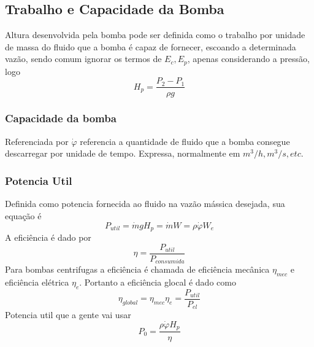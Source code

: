 \subsection{Trabalho e Capacidade da Bomba}
Altura desenvolvida pela bomba pode ser definida como o trabalho por unidade de massa do fluido que
a bomba é capaz de fornecer, escoando a determinada vazão, sendo comum ignorar os termos de
\(E_c,E_p\), apenas considerando a pressão, logo
\begin{equation}
    H_p = \frac{P_2 - P_1}{\rho g}
\end{equation}
 \subsubsection{Capacidade da bomba}
 Referenciada por \(\dot{\varphi }\) referencia a quantidade de fluido que a bomba consegue
 descarregar por unidade de tempo. Expressa, normalmente em \(m^3/h, m^3/s, etc\). 
 \subsubsection{Potencia Util}
 Definida como potencia fornecida ao fluido na vazão mássica desejada, sua equação é
 \begin{equation}
     P_{util} = \dot{m}gH_p = \dot{m}W = \rho \dot{\varphi} W_e
 \end{equation}
 A eficiência é dado por
 \begin{equation}
     \eta = \frac{P_{util}}{P_{consumida}}
 \end{equation}
 Para bombas centrifugas a eficiência é chamada de eficiência mecânica \(\eta_{mec}\) e eficiência
 elétrica \(\eta_e\). Portanto a eficiência glocal é dado como
 \begin{equation}
     \eta_{global} = \eta_{mec} \eta_e = \frac{P_{util}}{P_{el}}
 \end{equation}
 Potencia util que a gente vai usar
 \begin{equation}
    P_0 = \frac{\rho \dot{\varphi} H_p}{\eta }
 \end{equation}
